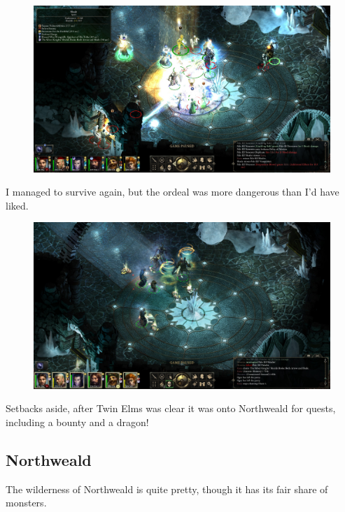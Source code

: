 \documentclass{article}
\begin{document}
\begin{figure}
\includegraphics[scale=0.33]{files/blog/2019_03_04_pillars_of_eternity_path_of_the_damned_act_iii/2019_03_04_oldsong4.jpg}
\end{figure}

I managed to survive again, but the ordeal was more dangerous than I'd have liked.

\begin{figure}
\includegraphics[scale=0.33]{files/blog/2019_03_04_pillars_of_eternity_path_of_the_damned_act_iii/2019_03_04_oldsong5.jpg}
\end{figure}

Setbacks aside, after Twin Elms was clear it was onto Northweald for quests, including a bounty and a dragon!

\subsection{Northweald}

The wilderness of Northweald is quite pretty, though it has its fair share of monsters.
\end{document}
